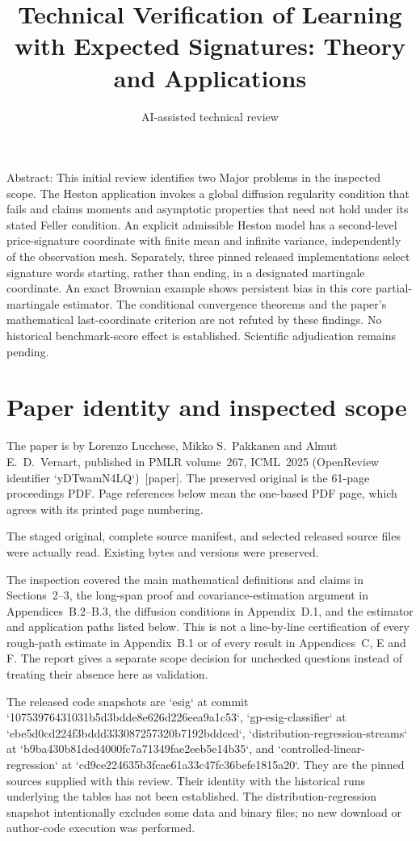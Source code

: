 \documentclass[10pt]{article}
\title{Technical Verification of
Learning with Expected Signatures: Theory and Applications}
\author{AI-assisted technical review}
\date{}
\begin{document}
\maketitle
Abstract: This initial review identifies two Major problems in the inspected scope. The Heston application invokes a global diffusion regularity condition that fails and claims moments and asymptotic properties that need not hold under its stated Feller condition. An explicit admissible Heston model has a second-level price-signature coordinate with finite mean and infinite variance, independently of the observation mesh. Separately, three pinned released implementations select signature words starting, rather than ending, in a designated martingale coordinate. An exact Brownian example shows persistent bias in this core partial-martingale estimator. The conditional convergence theorems and the paper’s mathematical last-coordinate criterion are not refuted by these findings. No historical benchmark-score effect is established. Scientific adjudication remains pending.\par
\section*{Paper identity and inspected scope}
The paper is by Lorenzo Lucchese, Mikko S. Pakkanen and Almut E. D. Veraart, published in PMLR volume 267, ICML 2025 (OpenReview identifier `yDTwamN4LQ`) [paper]. The preserved original is the 61-page proceedings PDF. Page references below mean the one-based PDF page, which agrees with its printed page numbering.\par
The staged original, complete source manifest, and selected released source files were actually read. Existing bytes and versions were preserved.\par
The inspection covered the main mathematical definitions and claims in Sections 2–3, the long-span proof and covariance-estimation argument in Appendices B.2–B.3, the diffusion conditions in Appendix D.1, and the estimator and application paths listed below. This is not a line-by-line certification of every rough-path estimate in Appendix B.1 or of every result in Appendices C, E and F. The report gives a separate scope decision for unchecked questions instead of treating their absence here as validation.\par
The released code snapshots are `esig` at commit `10753976431031b5d3bdde8e626d226eea9a1c53`, `gp-esig-classifier` at `ebe5d0cd224f3bddd333087257320b7192bddced`, `distribution-regression-streams` at `b9ba430b81ded4000fc7a71349fae2eeb5e14b35`, and `controlled-linear-regression` at `cd9ce224635b3fcae61a33c47fc36befe1815a20`. They are the pinned sources supplied with this review. Their identity with the historical runs underlying the tables has not been established. The distribution-regression snapshot intentionally excludes some data and binary files; no new download or author-code execution was performed.\par
\end{document}
